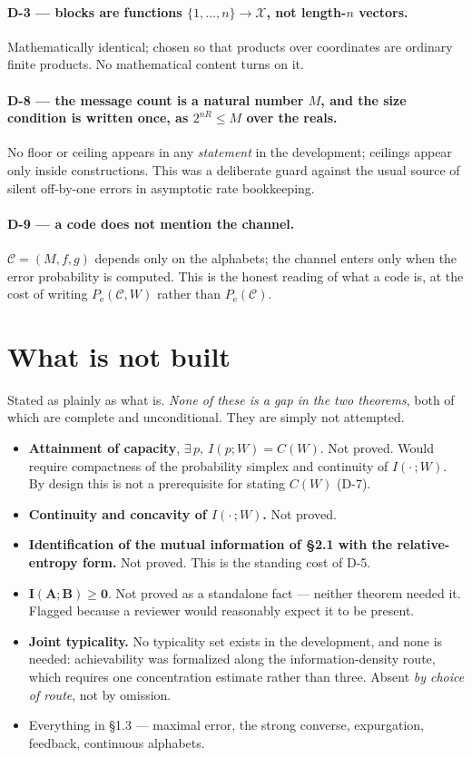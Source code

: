 \documentclass[11pt,a4paper]{article}
\newcommand{\X}{\mathcal{X}}
\newcommand{\Pe}{P_{\mathrm{e}}}
\newcommand{\code}{\mathcal{C}}
\begin{document}
\paragraph{D-3 --- blocks are functions $\{1,\dots,n\}\to\X$, not length-$n$
vectors.}
Mathematically identical; chosen so that products over coordinates are ordinary
finite products. No mathematical content turns on it.

\paragraph{D-8 --- the message count is a natural number $M$, and the size
condition is written once, as $2^{nR}\le M$ over the reals.}
No floor or ceiling appears in any \emph{statement} in the development; ceilings
appear only inside constructions. This was a deliberate guard against the usual
source of silent off-by-one errors in asymptotic rate bookkeeping.

\paragraph{D-9 --- a code does not mention the channel.}
$\code=(M,f,g)$ depends only on the alphabets; the channel enters only when the
error probability is computed. This is the honest reading of what a code is, at
the cost of writing $\Pe(\code,W)$ rather than $\Pe(\code)$.

\section{What is not built}

Stated as plainly as what is. \emph{None of these is a gap in the two theorems},
both of which are complete and unconditional. They are simply not attempted.

\begin{itemize}
  \item \textbf{Attainment of capacity}, $\exists\,p,\ I(p;W)=C(W)$. Not proved.
        Would require compactness of the probability simplex and continuity of
        $I(\cdot\,;W)$. By design this is not a prerequisite for stating $C(W)$
        (D-7).
  \item \textbf{Continuity and concavity of $I(\cdot\,;W)$.} Not proved.
  \item \textbf{Identification of the mutual information of \S2.1 with the
        relative-entropy form.} Not proved. This is the standing cost of D-5.
  \item $\boldsymbol{I(A;B)\ge 0}$. Not proved as a standalone fact --- neither
        theorem needed it. Flagged because a reviewer would reasonably expect it
        to be present.
  \item \textbf{Joint typicality.} No typicality set exists in the development,
        and none is needed: achievability was formalized along the
        information-density route, which requires one concentration estimate
        rather than three. Absent \emph{by choice of route}, not by omission.
  \item Everything in \S1.3 --- maximal error, the strong converse, expurgation,
        feedback, continuous alphabets.
\end{itemize}
\end{document}
